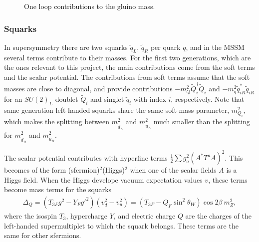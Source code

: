 \documentclass[twoside,english]{uiofysmaster}
\begin{document}
{\begin{figure}
\caption{One loop contributions to the gluino mass.}
\label{Fig:: physical background : Gluino loop contributions}
\end{figure}

\subsubsection{Squarks}\label{Sec:: phys back : Squarks}
In supersymmetry there are two squarks $\widetilde{q}_L$, $\widetilde{q}_R$ per quark $q$, and in the MSSM several terms contribute to their masses. For the first two generations, which are the ones relevant to this project, the main contributions come from the soft terms and the scalar potential. The contributions from soft terms assume that the soft masses are close to diagonal, and provide contributions $-m_Q^2 \widetilde{Q}_i^{\dagger} \widetilde{Q}_i$ and $-m_q^2 \widetilde{q}_{iR}^* \widetilde{q}_{iR}$ for an $SU(2)_L$ doublet $\widetilde{Q}_i$ and singlet $\widetilde{q}_i$ with index $i$, respectively. Note that same generation left-handed squarks share the same soft mass parameter, $m_{Q_i}^2$, which makes the splitting between $m_{\widetilde{d}_L}^2$ and $m_{\widetilde{u}_L}^2$ much smaller than the splitting for $m_{\widetilde{d}_R}^2$ and $m_{\widetilde{u}_R}^2$. 

The scalar potential contributes with hyperfine terms $\frac{1}{2} \sum g_a^2 (A^* T^a A)^2$. This becomes of the form (sfermion)$^2$(Higgs)$^2$ when one of the scalar fields $A$ is a Higgs field. When the Higgs develope vacuum expectation values $v$, these terms become mass terms for the squarks
\begin{align}
\Delta_Q = (T_{3F}g^2 - Y_F{g'}^2)(v_d^2 - v_u^2) = (T_{3F} - Q_F \sin^2 \theta_W ) \cos 2 \beta ~ m_Z^2,
\end{align} 
where the isospin $T_3$, hypercharge $Y$, and electric charge $Q$ are the charges of the left-handed supermultiplet to which the squark belongs. These terms are the same for other sfermions. 

}
\end{document}
